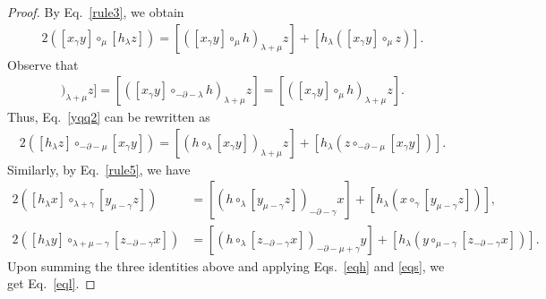 \documentclass[11pt,letterpaper,reqno]{amsart}
\theoremstyle{definition}
\numberwithin{equation}{section}
\begin{document}
\begin{proof}
By Eq.~\eqref{rule3}, we obtain
   \begin{align}\label{yqq2}
      2\left([x_{\gamma}y]\circ_{\mu}[h_{\lambda}z]\right)=[([x_{\gamma}y]\circ_{\mu}h)_{\lambda+\mu}z]+[h_{\lambda}([x_{\gamma}y]\circ_{\mu}z)].
   \end{align}
Observe that
   \begin{align*}
      [(h\circ_{\lambda}[x_{\gamma}y])_{\lambda+\mu}z]=[([x_{\gamma}y]\circ_{-\partial-\lambda}h)_{\lambda+\mu}z]
      =[([x_{\gamma}y]\circ_{\mu}h)_{\lambda+\mu}z].
   \end{align*}
Thus, Eq.~\eqref{yqq2} can be rewritten as
   \begin{align*}
      2\left([h_{\lambda}z]\circ_{-\partial-\mu}[x_{\gamma}y]\right)=[(h\circ_{\lambda}[x_{\gamma}y])_{\lambda+\mu}z]+[h_{\lambda}(z\circ_{-\partial-\mu}[x_{\gamma}y])].
   \end{align*}
Similarly, by Eq.~\eqref{rule5}, we have
   \begin{align*}
      2([h_{\lambda}x]\circ_{\lambda+\gamma}[y_{\mu-\gamma}z])&=[(h\circ_{\lambda}[y_{\mu-\gamma}z])_{-\partial-\gamma}x]+[h_{{\lambda}}(x\circ_{\gamma}[y_{\mu-\gamma}z])],\\
      2([h_{\lambda}y]\circ_{\lambda+\mu-\gamma}[z_{-\partial-\gamma}x])&=[(h\circ_{\lambda}[z_{-\partial-\gamma}x])_{-\partial-\mu+\gamma}y]+[h_{{\lambda}}(y\circ_{\mu-\gamma}[z_{-\partial-\gamma}x])].
   \end{align*}
Upon summing the three identities above and applying Eqs.~\eqref{eqh} and \eqref{eqs}, we get Eq.~\eqref{eql}.


\end{proof}
\end{document}
